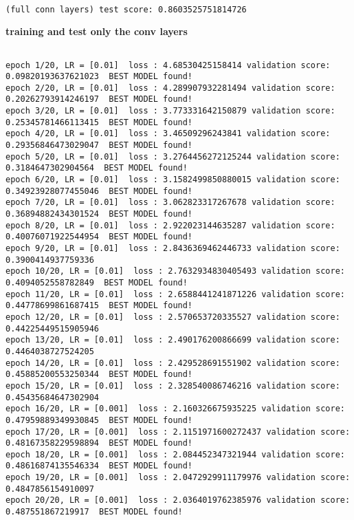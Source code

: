 \documentclass[11pt]{article}
\begin{document}
  
    
    \begin{center}
    \end{center}
    { \hspace*{\fill} \\}
    
    

    
    \begin{Verbatim}[commandchars=\\\{\}]
 (full conn layers) test score: 0.8603525751814726
 \end{Verbatim}

    \textbf{training and test only the conv layers}

    \begin{Verbatim}[commandchars=\\\{\}]

epoch 1/20, LR = [0.01]  loss : 4.68530425158414 validation score:
0.09820193637621023  BEST MODEL found!
epoch 2/20, LR = [0.01]  loss : 4.289907932281494 validation score:
0.20262793914246197  BEST MODEL found!
epoch 3/20, LR = [0.01]  loss : 3.773331642150879 validation score:
0.25345781466113415  BEST MODEL found!
epoch 4/20, LR = [0.01]  loss : 3.46509296243841 validation score:
0.29356846473029047  BEST MODEL found!
epoch 5/20, LR = [0.01]  loss : 3.2764456272125244 validation score:
0.3184647302904564  BEST MODEL found!
epoch 6/20, LR = [0.01]  loss : 3.1582499850880015 validation score:
0.34923928077455046  BEST MODEL found!
epoch 7/20, LR = [0.01]  loss : 3.062823317267678 validation score:
0.36894882434301524  BEST MODEL found!
epoch 8/20, LR = [0.01]  loss : 2.922023144635287 validation score:
0.40076071922544954  BEST MODEL found!
epoch 9/20, LR = [0.01]  loss : 2.8436369462446733 validation score:
0.3900414937759336
epoch 10/20, LR = [0.01]  loss : 2.7632934830405493 validation score:
0.4094052558782849  BEST MODEL found!
epoch 11/20, LR = [0.01]  loss : 2.6588441241871226 validation score:
0.44778699861687415  BEST MODEL found!
epoch 12/20, LR = [0.01]  loss : 2.570653720335527 validation score:
0.44225449515905946
epoch 13/20, LR = [0.01]  loss : 2.490176200866699 validation score:
0.4464038727524205
epoch 14/20, LR = [0.01]  loss : 2.429528691551902 validation score:
0.45885200553250344  BEST MODEL found!
epoch 15/20, LR = [0.01]  loss : 2.328540086746216 validation score:
0.45435684647302904
epoch 16/20, LR = [0.001]  loss : 2.160326675935225 validation score:
0.47959889349930845  BEST MODEL found!
epoch 17/20, LR = [0.001]  loss : 2.1151971600272437 validation score:
0.48167358229598894  BEST MODEL found!
epoch 18/20, LR = [0.001]  loss : 2.084452347321944 validation score:
0.48616874135546334  BEST MODEL found!
epoch 19/20, LR = [0.001]  loss : 2.0472929911179976 validation score:
0.4847856154910097
epoch 20/20, LR = [0.001]  loss : 2.0364019762385976 validation score:
0.487551867219917  BEST MODEL found!
\end{Verbatim}
\end{document}
